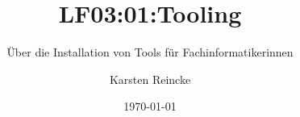\documentclass[]{beamer}
\title{LF03:01:Tooling}
\subtitle{Über die Installation von Tools für Fachinformatikerinnen}
\institute{GS-LDK}
\author{Karsten Reincke}
\date{\today}
\def\cfgGl{../../../cfg.gl/}
\begin{document}

\begin{frame}
  \titlepage
\end{frame}






\logo{}
\newpage



%
\end{document}
